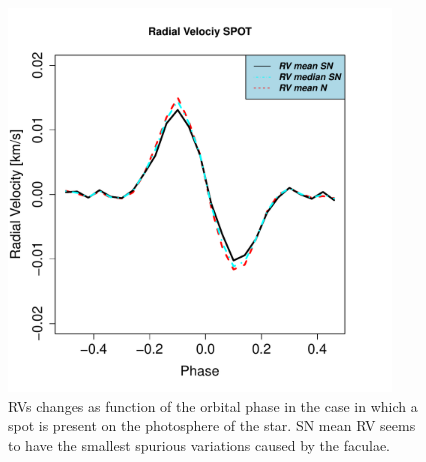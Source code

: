 \documentclass[11pt, oneside]{article}
\begin{document}
{\begin{figure}[htbp]
   \centering
\includegraphics[height = 4in]{RV_comparison_SPOT.pdf} 
\caption{RVs changes as function of the orbital phase in the case in which a spot is present on the photosphere of the star. SN mean RV seems to have the smallest spurious variations caused by the faculae.}
    \label{fig:spot}
\end{figure}

}
\end{document}
